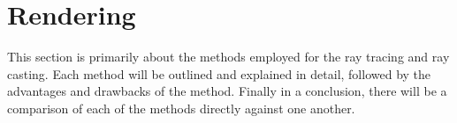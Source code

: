 \documentclass[../main.tex]{subfiles}
\begin{document}
\section{Rendering}%
\label{sec:rendering}

This section is primarily about the methods employed for the ray tracing and
ray casting. Each method will be outlined and explained in detail, followed by
the advantages and drawbacks of the method. Finally in a conclusion, there will
be a comparison of each of the methods directly against one another.


\end{document}

